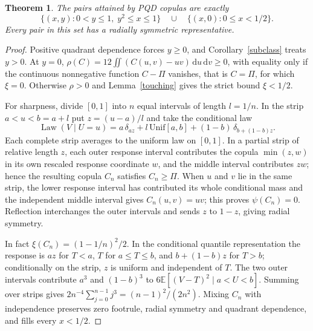 \documentclass[11pt,a4paper]{article}
\newtheorem{theorem}{Theorem}
\theoremstyle{remark}
\newcommand{\E}{\mathbb E}
\newcommand{\1}{\mathbf 1}
\newcommand{\dd}{\,\mathrm d}
\DeclareMathOperator{\Law}{Law}
\begin{document}
\begin{theorem}\label{pqd}
The pairs attained by PQD copulas are exactly
\[
 \{(x,y):0<y\le1,\;y^2\le x\le1\}
 \quad\cup\quad \{(x,0):0\le x<1/2\}.
\]
Every pair in this set has a radially symmetric representative.
\end{theorem}
\begin{proof}
Positive quadrant dependence forces $y\ge0$, and Corollary~\ref{subclass} treats $y>0$. At $y=0$, $\rho(C)=12\iint(C(u,v)-uv)\dd u\dd v\ge0$, with equality only if the continuous nonnegative function $C-\Pi$ vanishes, that is $C=\Pi$, for which $\xi=0$. Otherwise $\rho>0$ and Lemma~\ref{touching} gives the strict bound $\xi<1/2$.

For sharpness, divide $[0,1]$ into $n$ equal intervals of length $l=1/n$. In the strip $a<u<b=a+l$ put $z=(u-a)/l$ and take the conditional law
\[
  \Law(V\mid U=u)
    =a\,\delta_{az}+l\,\mathrm{Unif}[a,b]
             +(1-b)\,\delta_{b+(1-b)z}.
\]
Each complete strip averages to the uniform law on $[0,1]$. In a partial strip of relative length $z$, each outer response interval contributes the copula $\min(z,w)$ in its own rescaled response coordinate $w$, and the middle interval contributes $zw$; hence the resulting copula $C_n$ satisfies $C_n\ge\Pi$. When $u$ and $v$ lie in the same strip, the lower response interval has contributed its whole conditional mass and the independent middle interval gives $C_n(u,v)=uv$; this proves $\psi(C_n)=0$. Reflection interchanges the outer intervals and sends $z$ to $1-z$, giving radial symmetry.

In fact $\xi(C_n)=(1-1/n)^2/2$. In the conditional quantile representation the response is $az$ for $T<a$, $T$ for $a\le T\le b$, and $b+(1-b)z$ for $T>b$; conditionally on the strip, $z$ is uniform and independent of $T$. The two outer intervals contribute $a^3$ and $(1-b)^3$ to $6\E[(V-T)^2\mid a<U<b]$. Summing over strips gives $2n^{-4}\sum_{j=0}^{n-1}j^3=(n-1)^2/(2n^2)$. Mixing $C_n$ with independence preserves zero footrule, radial symmetry and quadrant dependence, and fills every $x<1/2$.
\end{proof}
\end{document}

